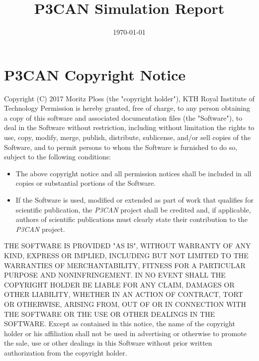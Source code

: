 \documentclass[11pt]{article}
\title{P3CAN Simulation Report \\ \VAR{sim_name} }
\author{\today \\ \VAR{user_name} }
\date{}
\begin{document}
\maketitle
\thispagestyle{fancy}
\tableofcontents
\pagebreak

\section*{P3CAN Copyright Notice}
Copyright (C) 2017 Moritz Ploss (the "copyright holder"), KTH Royal Institute of Technology
\newline\newline
\noindent Permission is hereby granted, free of charge, to any person obtaining a copy of this software and associated
documentation files (the "Software"), to deal in the Software without restriction, including without limitation the
rights to use, copy, modify, merge, publish, distribute, sublicense, and/or sell copies of the Software, and to
permit persons to whom the Software is furnished to do so, subject to the following conditions:
\begin{itemize}
\item The above copyright notice and all permission notices shall be included in all copies or substantial portions of
the Software.
\item If the Software is used, modified or extended as part of work that qualifies for scientific publication, the \emph{P3CAN}
project shall be credited and, if applicable, authors of scientific publications must clearly state their contribution
to the \emph{P3CAN} project.
\end{itemize}
\noindent THE SOFTWARE IS PROVIDED "AS IS", WITHOUT WARRANTY OF ANY KIND, EXPRESS OR IMPLIED, INCLUDING BUT NOT LIMITED TO
THE WARRANTIES OF MERCHANTABILITY, FITNESS FOR A PARTICULAR PURPOSE AND NONINFRINGEMENT. IN NO EVENT SHALL THE
COPYRIGHT HOLDER BE LIABLE FOR ANY CLAIM, DAMAGES OR OTHER LIABILITY, WHETHER IN AN ACTION OF CONTRACT, TORT
OR OTHERWISE, ARISING FROM, OUT OF OR IN CONNECTION WITH THE SOFTWARE OR THE USE OR
OTHER DEALINGS IN THE SOFTWARE.
\newline\newline
\noindent Except as contained in this notice, the name of the copyright holder or his affiliation shall not be used in
advertising or otherwise to promote the sale, use or other dealings in this Software without prior written
authorization from the copyright holder.
\pagebreak
\end{document}
